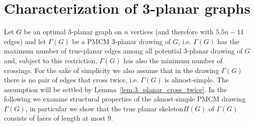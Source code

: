 \section{Characterization of 3-planar graphs}
\label{sec:3planar}

Let $G$ be an optimal $3$-planar graph on $n$ vertices (and therefore with $5.5n-11$ edges) and let $\Gamma(G)$ be a PMCM $3$-planar drawing of $G$, i.e. $\Gamma(G)$ has the maximum number of true-planar edges among all potential $3$-planar drawing of $G$ and, subject to this restriction, $\Gamma(G)$ has also the minimum number of crossings. 
For the sake of simplicity we also assume that in the drawing $\Gamma(G)$ there is no pair of edges that cross twice, i.e. $\Gamma(G)$ is almost-simple. The assumption  will be settled  by Lemma~\ref{lem:3_planar_cross_twice}. In the following we examine structural properties of the almost-simple PMCM drawing $\Gamma(G)$, in particular we show  that the true planar skeleton$\Pi(G)$ of $\Gamma(G)$ consists of faces of length at most $9$. 


